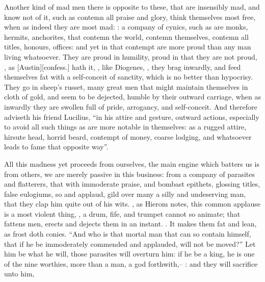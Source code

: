 Another kind of mad men there is opposite to these, that are insensibly mad,
and know not of it, such as contemn all praise and glory, think themselves most
free, when as indeed they are most mad: : a company
of cynics, such as are monks, hermits, anchorites, that contemn the world,
contemn themselves, contemn all titles, honours, offices: and yet in that
contempt are more proud than any man living whatsoever. They are proud in
humility, proud in that they are not proud, , as [Austin][\textlatin{confess.}] hath it, , like Diogenes, , they brag inwardly,
and feed themselves fat with a self-conceit of sanctity, which is no better
than hypocrisy. They go in sheep's russet, many great men that might maintain
themselves in cloth of gold, and seem to be dejected, humble by their outward
carriage, when as inwardly they are swollen full of pride, arrogancy, and
self-conceit. And therefore \Seneca{} adviseth his friend Lucilius,
\enquote{in his attire and gesture, outward actions, especially to
avoid all such things as are more notable in themselves: as a rugged attire,
hirsute head, horrid beard, contempt of money, coarse lodging, and whatsoever
leads to fame that opposite way}.

All this madness yet proceeds from ourselves, the main engine which batters us
is from others, we are merely passive in this business: from a company of
parasites and flatterers, that with immoderate praise, and bombast epithets,
glossing titles, false eulogiums, so  and
applaud, gild over many a silly and undeserving man, that they clap him quite
out of his wits. , as Hierom notes, this common
applause is a most violent thing, , a drum, fife, and
trumpet cannot so animate; that fattens men, erects and dejects them in an
instant. .
It makes them fat and lean, as frost doth conies. \enquote{And who
is that mortal man that can so contain himself, that if he be immoderately
commended and applauded, will not be moved?} Let him be what he will, those
parasites will overturn him: if he be a king, he is one of the nine worthies,
more than a man, a god forthwith,-- : and they will sacrifice unto him,


